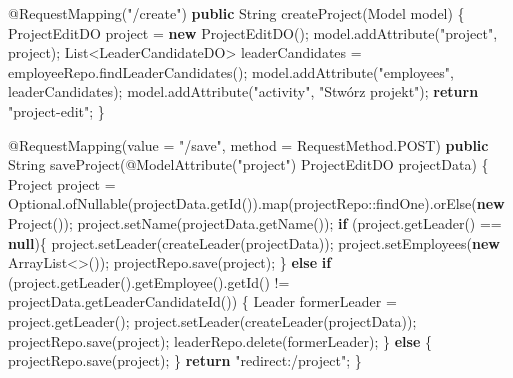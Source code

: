 \documentclass[]{article}
\newenvironment{Shaded}{}{}
\newcommand{\AttributeTok}[1]{\textcolor[rgb]{0.49,0.56,0.16}{#1}}
\newcommand{\BuiltInTok}[1]{#1}
\newcommand{\FunctionTok}[1]{\textcolor[rgb]{0.02,0.16,0.49}{#1}}
\newcommand{\KeywordTok}[1]{\textcolor[rgb]{0.00,0.44,0.13}{\textbf{#1}}}
\newcommand{\NormalTok}[1]{#1}
\newcommand{\StringTok}[1]{\textcolor[rgb]{0.25,0.44,0.63}{#1}}
\begin{document}
\begin{Shaded}
\begin{Highlighting}[]
\AttributeTok{@RequestMapping}\NormalTok{(}\StringTok{"/create"}\NormalTok{)}
\KeywordTok{public} \BuiltInTok{String} \FunctionTok{createProject}\NormalTok{(Model model) \{}
\NormalTok{  ProjectEditDO project = }\KeywordTok{new} \FunctionTok{ProjectEditDO}\NormalTok{();}
\NormalTok{  model.}\FunctionTok{addAttribute}\NormalTok{(}\StringTok{"project"}\NormalTok{, project);}
  \BuiltInTok{List}\NormalTok{<LeaderCandidateDO> leaderCandidates = employeeRepo.}\FunctionTok{findLeaderCandidates}\NormalTok{();}
\NormalTok{  model.}\FunctionTok{addAttribute}\NormalTok{(}\StringTok{"employees"}\NormalTok{, leaderCandidates);}
\NormalTok{  model.}\FunctionTok{addAttribute}\NormalTok{(}\StringTok{"activity"}\NormalTok{, }\StringTok{"Stwórz projekt"}\NormalTok{);}
  \KeywordTok{return} \StringTok{"project-edit"}\NormalTok{;}
\NormalTok{\}}

\AttributeTok{@RequestMapping}\NormalTok{(value = }\StringTok{"/save"}\NormalTok{, method = RequestMethod.}\FunctionTok{POST}\NormalTok{)}
\KeywordTok{public} \BuiltInTok{String} \FunctionTok{saveProject}\NormalTok{(}\AttributeTok{@ModelAttribute}\NormalTok{(}\StringTok{"project"}\NormalTok{) ProjectEditDO projectData) \{}
\NormalTok{  Project project = Optional.}\FunctionTok{ofNullable}\NormalTok{(projectData.}\FunctionTok{getId}\NormalTok{()).}\FunctionTok{map}\NormalTok{(projectRepo::findOne).}\FunctionTok{orElse}\NormalTok{(}\KeywordTok{new} \FunctionTok{Project}\NormalTok{());}
\NormalTok{  project.}\FunctionTok{setName}\NormalTok{(projectData.}\FunctionTok{getName}\NormalTok{());}
  \KeywordTok{if}\NormalTok{ (project.}\FunctionTok{getLeader}\NormalTok{() == }\KeywordTok{null}\NormalTok{)\{}
\NormalTok{    project.}\FunctionTok{setLeader}\NormalTok{(}\FunctionTok{createLeader}\NormalTok{(projectData));}
\NormalTok{    project.}\FunctionTok{setEmployees}\NormalTok{(}\KeywordTok{new} \BuiltInTok{ArrayList}\NormalTok{<>());}
\NormalTok{    projectRepo.}\FunctionTok{save}\NormalTok{(project);}
\NormalTok{  \} }\KeywordTok{else} \KeywordTok{if}\NormalTok{ (project.}\FunctionTok{getLeader}\NormalTok{().}\FunctionTok{getEmployee}\NormalTok{().}\FunctionTok{getId}\NormalTok{() != projectData.}\FunctionTok{getLeaderCandidateId}\NormalTok{()) \{}
\NormalTok{    Leader formerLeader = project.}\FunctionTok{getLeader}\NormalTok{();}
\NormalTok{    project.}\FunctionTok{setLeader}\NormalTok{(}\FunctionTok{createLeader}\NormalTok{(projectData));}
\NormalTok{    projectRepo.}\FunctionTok{save}\NormalTok{(project);}
\NormalTok{    leaderRepo.}\FunctionTok{delete}\NormalTok{(formerLeader);}
\NormalTok{  \} }\KeywordTok{else}\NormalTok{ \{}
\NormalTok{    projectRepo.}\FunctionTok{save}\NormalTok{(project);}
\NormalTok{  \}}
  \KeywordTok{return} \StringTok{"redirect:/project"}\NormalTok{;}
\NormalTok{\}}
\end{Highlighting}
\end{Shaded}
\end{document}
